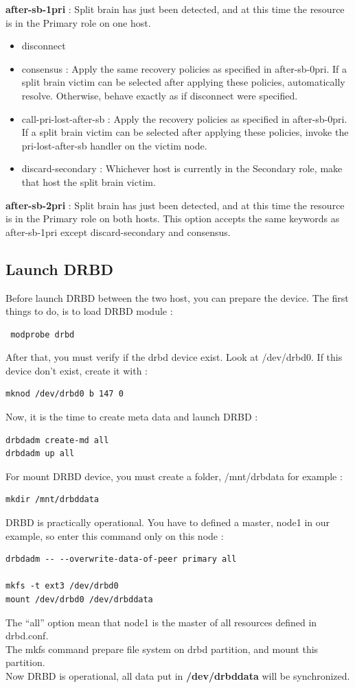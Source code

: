 \documentclass[a4paper,10pt]{report}
\begin{document}
\textbf{after-sb-1pri} : Split brain has just been detected, and at this time the resource is in the Primary role on one host.
\begin{itemize}
\item disconnect 
\item consensus : Apply the same recovery policies as specified in after-sb-0pri. If a split brain victim can be selected after applying these policies, automatically resolve. Otherwise, behave exactly as if disconnect were specified.
\item call-pri-lost-after-sb : Apply the recovery policies as specified in after-sb-0pri. If a split brain victim can be selected after applying these policies, invoke the pri-lost-after-sb handler on the victim node.
\item discard-secondary : Whichever host is currently in the Secondary role, make that host the split brain victim.
\end{itemize}
\textbf{after-sb-2pri} : Split brain has just been detected, and at this time the resource is in the Primary role on both hosts. This option accepts the same keywords as after-sb-1pri except discard-secondary and consensus.

\subsection{Launch DRBD}
Before launch DRBD between the two host, you can prepare the device. The first things to do, is to load DRBD module :
\begin{lstlisting}
 modprobe drbd
\end{lstlisting}
After that, you must verify if the drbd device exist. Look at /dev/drbd0. If this device don't exist, create it with :
\begin{lstlisting}
mknod /dev/drbd0 b 147 0
\end{lstlisting}
Now, it is the time to create meta data and launch DRBD :
\begin{lstlisting}
drbdadm create-md all
drbdadm up all
\end{lstlisting}
For mount DRBD device, you must create a folder, /mnt/drbdata for example :
\begin{lstlisting}
mkdir /mnt/drbddata
\end{lstlisting}
DRBD is practically operational. You have to defined a master, node1 in our example, so enter this command only on this node :
\begin{lstlisting}
drbdadm -- --overwrite-data-of-peer primary all

mkfs -t ext3 /dev/drbd0
mount /dev/drbd0 /dev/drbddata
\end{lstlisting}
The ``all'' option mean that node1 is the master of all resources defined in drbd.conf.\\
The mkfs command prepare file system on drbd partition, and mount this partition.\\
Now DRBD is operational, all data put in \textbf{/dev/drbddata} will be synchronized.
\end{document}
